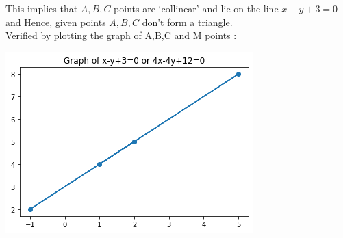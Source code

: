 \documentclass[journal,12pt,twocolumn]{IEEEtran}
\begin{document}
 This implies that $A,B,C$ points are `collinear' and lie on the line $x-y+3=0$ and Hence, given points $A,B,C$ don't form a triangle.\newline\\
Verified by plotting the graph of A,B,C and M points :
\begin{center}
  \includegraphics[scale=0.6]{prv1b.png}
\end{center}
    
\end{document}
